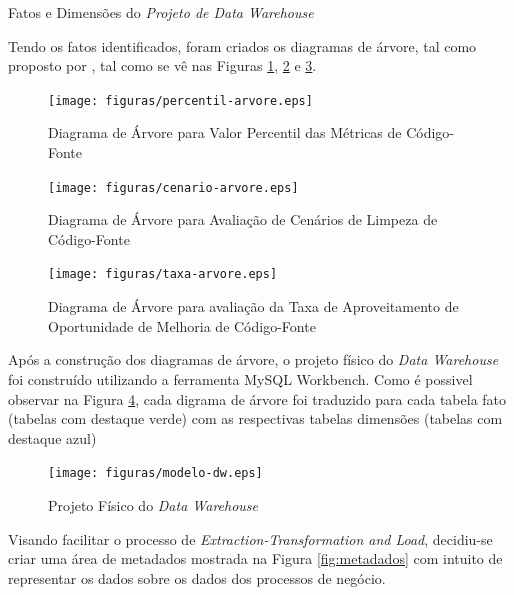 \textcolor{red}{}


\begin{table}[h]
\centering

\caption{Fatos e Dimensões do \textit{Projeto de Data Warehouse} }
\label{tab:dimensoes-fato}
\end{table}
\FloatBarrier

Tendo os fatos identificados, foram criados os diagramas de árvore, tal como proposto por , tal como se vê nas Figuras \ref{fig:percentil-arvore}, \ref{fig:cenario-arvore} e \ref{fig:taxa-arvore}.

\begin{figure}[h]
\centering
\texttt{[image: figuras/percentil-arvore.eps]}
\caption{Diagrama de Árvore para Valor Percentil das Métricas de Código-Fonte}
\label{fig:percentil-arvore}
\end{figure}
\FloatBarrier


\begin{figure}[h]
\centering
\texttt{[image: figuras/cenario-arvore.eps]}
\caption{Diagrama de Árvore para Avaliação de Cenários de Limpeza de Código-Fonte}
\label{fig:cenario-arvore}
\end{figure}
\FloatBarrier


\begin{figure}[ht!]
\centering
\texttt{[image: figuras/taxa-arvore.eps]}
\caption{Diagrama de Árvore para avaliação da Taxa de Aproveitamento de Oportunidade de Melhoria de Código-Fonte}
\label{fig:taxa-arvore}
\end{figure}
\FloatBarrier


Após a construção dos diagramas de árvore, o projeto físico do \textit{Data Warehouse} foi construído utilizando a ferramenta MySQL Workbench. Como é possivel observar na Figura \ref{fig:project-dw}, cada digrama de árvore foi traduzido para cada tabela fato (tabelas com destaque verde) com as respectivas tabelas dimensões (tabelas com destaque azul)


\begin{figure}[ht!]
\centering
\texttt{[image: figuras/modelo-dw.eps]}
\caption{Projeto Físico do \textit{Data Warehouse}}
\label{fig:project-dw}
\end{figure}
\FloatBarrier

Visando facilitar o processo de \textit{Extraction-Transformation and Load}, decidiu-se criar uma área de metadados mostrada na Figura \ref{fig:metadados} com intuito de representar os dados sobre os dados dos processos de negócio.

